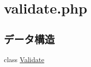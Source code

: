 \hypertarget{validate_8php}{
\section{validate.php}
\label{validate_8php}
}
\subsection*{データ構造}
\begin{DoxyCompactItemize}
\item 
class \hyperlink{class_validate}{\-Validate}
\end{DoxyCompactItemize}
